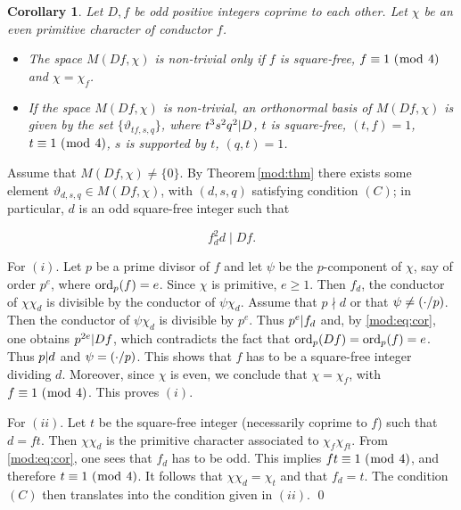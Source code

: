 \documentclass[leqno,10pt]{amsart}
\theoremstyle{plain}
\numberwithin{equation}{section}
\newtheorem{cor}[thm]{Corollary}
\theoremstyle{definition}
\theoremstyle{remark}
\begin{document}
\begin{cor}\label{mod:cor}
Let $D,f$ be odd positive integers coprime to each other. Let $\chi$ be an even primitive character of conductor $f$. 
\begin{itemize}
\item[$(i)$] The space $M(Df,\chi)$ is non-trivial only if $f$ is square-free, $f\equiv 1 \ (\bmod\  4)$ and $\chi=\chi_f$.
\item[$(ii)$] If the space $M(Df,\chi)$ is non-trivial, an orthonormal basis of $M(Df,\chi)$ is given by the set $\{\vartheta_{tf,s,q}\}$, where $t^3s^2q^2 \vert D$, $t$ is square-free, $(t,f)=1$, $t\equiv 1 \ (\bmod\  4)$, $s$ is supported by $t$, $(q,t)=1$. 
\end{itemize}
\end{cor}

\proof 
Assume that $M(Df,\chi)\neq \{0\}$. By Theorem\,\ref{mod:thm} there exists some element $\vartheta_{d,s,q}\in M(Df,\chi)$, with $(d,s,q)$ satisfying condition $(C)$; in particular, $d$ is an odd square-free integer such that 

\begin{equation}\label{mod:eq:cor}
f_d^2 d\mid Df.
\end{equation}

For $(i)$. Let $p$ be a prime divisor of $f$ and let $\psi$ be the $p$-component of $\chi$, say of order $p^e$, where $\textnormal{ord}_p(f)=e$. Since $\chi$ is primitive, $e \geqslant 1$. Then $f_d$, the conductor of $\chi\chi_d$ is divisible by the conductor of $\psi\chi_d$. 
Assume that $p\nmid d$ or that $\psi\neq (\cdot/p)$. Then the conductor of $\psi\chi_d$ is divisible by $p^e$. Thus $p^e\vert f_d$ and, by \eqref{mod:eq:cor}, one obtains $p^{2e}\vert Df$, which contradicts the fact that $\textnormal{ord}_p(Df)=\textnormal{ord}_p(f)=e$. 
Thus $p\vert d$ and $\psi=(\cdot/p)$. This shows that $f$ has to be a square-free integer dividing $d$. Moreover, since $\chi$ is even, we conclude that $\chi=\chi_f$, with $f\equiv 1 \ (\bmod\  4)$. This proves $(i)$. 

For $(ii)$. Let $t$ be the square-free integer (necessarily coprime to $f$) such that $d=ft$. Then $\chi\chi_d$ is the primitive character associated to $\chi_f\chi_{ft}$. From \eqref{mod:eq:cor}, one sees that $f_d$ has to be odd. This implies $ft\equiv 1 \ (\bmod\  4)$, and therefore $t\equiv 1 \ (\bmod\  4)$. It follows that $\chi\chi_d=\chi_t$ and that $f_d=t$. The condition $(C)$ then translates into the condition given in $(ii)$.
\qed

\end{document}
